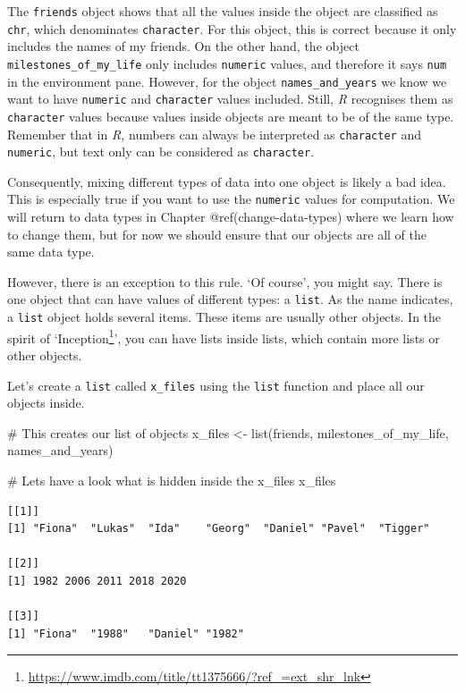 \documentclass[
  letterpaper,
]{krantz}
\makeatletter
\newenvironment{Shaded}{\begin{snugshade}}{\end{snugshade}}
\newcommand{\CommentTok}[1]{\textcolor[rgb]{0.37,0.37,0.37}{#1}}
\newcommand{\FunctionTok}[1]{\textcolor[rgb]{0.28,0.35,0.67}{#1}}
\newcommand{\NormalTok}[1]{\textcolor[rgb]{0.00,0.23,0.31}{#1}}
\newcommand{\OtherTok}[1]{\textcolor[rgb]{0.00,0.23,0.31}{#1}}
\renewcommand{\href}[2]{#2\footnote{\url{#1}}}
\newenvironment{kframe}{%
\medskip{}
\setlength{\fboxsep}{.8em}
 \def\at@end@of@kframe{}%
 \ifinner\ifhmode%
  \def\at@end@of@kframe{\end{minipage}}%
  \begin{minipage}{\columnwidth}%
 \fi\fi%
 \def\FrameCommand##1{\hskip\@totalleftmargin \hskip-\fboxsep
 \colorbox{shadecolor}{##1}\hskip-\fboxsep
     \hskip-\linewidth \hskip-\@totalleftmargin \hskip\columnwidth}%
 \MakeFramed {\advance\hsize-\width
   \@totalleftmargin\z@ \linewidth\hsize
   \@setminipage}}%
 {\par\unskip\endMakeFramed%
 \at@end@of@kframe}
\renewenvironment{Shaded}{\begin{kframe}}{\end{kframe}}
\makeatother
\begin{document}
The \texttt{friends} object shows that all the values inside the object
are classified as \texttt{chr}, which denominates \texttt{character}.
For this object, this is correct because it only includes the names of
my friends. On the other hand, the object
\texttt{milestones\_of\_my\_life} only includes \texttt{numeric} values,
and therefore it says \texttt{num} in the environment pane. However, for
the object \texttt{names\_and\_years} we know we want to have
\texttt{numeric} and \texttt{character} values included. Still, \emph{R}
recognises them as \texttt{character} values because values inside
objects are meant to be of the same type. Remember that in \emph{R,}
numbers can always be interpreted as \texttt{character} and
\texttt{numeric}, but text only can be considered as \texttt{character}.

Consequently, mixing different types of data into one object is likely a
bad idea. This is especially true if you want to use the
\texttt{numeric} values for computation. We will return to data types in
Chapter @ref(change-data-types) where we learn how to change them, but
for now we should ensure that our objects are all of the same data type.

However, there is an exception to this rule. `Of course', you might say.
There is one object that can have values of different types: a
\texttt{list}. As the name indicates, a \texttt{list} object holds
several items. These items are usually other objects. In the spirit of
`\href{https://www.imdb.com/title/tt1375666/?ref_=ext_shr_lnk}{Inception}',
you can have lists inside lists, which contain more lists or other
objects.

Let's create a \texttt{list} called \texttt{x\_files} using the
\texttt{list} function and place all our objects inside.

\begin{Shaded}
\begin{Highlighting}[]
\CommentTok{\# This creates our list of objects}
\NormalTok{x\_files }\OtherTok{\textless{}{-}} \FunctionTok{list}\NormalTok{(friends,}
\NormalTok{                milestones\_of\_my\_life,}
\NormalTok{                names\_and\_years)}

\CommentTok{\# Let\textquotesingle{}s have a look what is hidden inside the x\_files}
\NormalTok{x\_files}
\end{Highlighting}
\end{Shaded}

\begin{verbatim}
[[1]]
[1] "Fiona"  "Lukas"  "Ida"    "Georg"  "Daniel" "Pavel"  "Tigger"

[[2]]
[1] 1982 2006 2011 2018 2020

[[3]]
[1] "Fiona"  "1988"   "Daniel" "1982"  
\end{verbatim}
\end{document}
